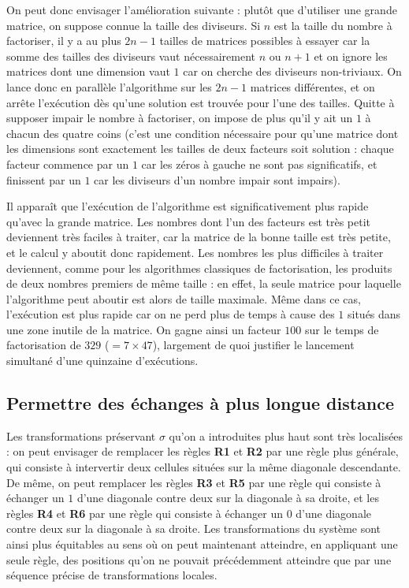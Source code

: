 \documentclass[11pt, openany]{article}
\begin{document}
On peut donc envisager l'amélioration suivante : plutôt que d'utiliser une grande matrice, on suppose connue la taille des diviseurs. Si $n$ est la taille du nombre à factoriser, il y a au plus $2n-1$ tailles de matrices possibles à essayer car la somme des tailles des diviseurs vaut nécessairement $n$ ou $n+1$ et on ignore les matrices dont une dimension vaut $1$ car on cherche des diviseurs non-triviaux. On lance donc en parallèle l'algorithme sur les $2n-1$ matrices différentes, et on arrête l'exécution dès qu'une solution est trouvée pour l'une des tailles. Quitte à supposer impair le nombre à factoriser, on impose de plus qu'il y ait un $1$ à chacun des quatre coins (c'est une condition nécessaire pour qu'une matrice dont les dimensions sont exactement les tailles de deux facteurs soit solution : chaque facteur commence par un $1$ car les zéros à gauche ne sont pas significatifs, et finissent par un $1$ car les diviseurs d'un nombre impair sont impairs). 

\medskip
Il apparaît que l'exécution de l'algorithme est significativement plus rapide qu'avec la grande matrice. Les nombres dont l'un des facteurs est très petit deviennent très faciles à traiter, car la matrice de la bonne taille est très petite, et le calcul y aboutit donc rapidement. Les nombres les plus difficiles à traiter deviennent, comme pour les algorithmes classiques de factorisation, les produits de deux nombres premiers de même taille : en effet, la seule matrice pour laquelle l'algorithme peut aboutir est alors de taille maximale. Même dans ce cas, l'exécution est plus rapide car on ne perd plus de temps à cause des $1$ situés dans une zone inutile de la matrice. On gagne ainsi un facteur $100$ sur le temps de factorisation de $329$ ($ =7\times 47$), largement de quoi justifier le lancement simultané d'une quinzaine d'exécutions. %


\subsection*{Permettre des échanges à plus longue distance}

Les transformations préservant $\sigma$ qu'on a introduites plus haut sont très localisées : on peut envisager de remplacer les règles \textbf{R1} et \textbf{R2} par une règle plus générale, qui consiste à intervertir deux cellules situées sur la même diagonale descendante. De même, on peut remplacer les règles \textbf{R3} et \textbf{R5} par une règle qui consiste à échanger un $1$ d'une diagonale contre deux sur la diagonale à sa droite, et les règles \textbf{R4} et \textbf{R6} par une règle qui consiste à échanger un $0$ d'une diagonale contre deux sur la diagonale à sa droite. Les transformations du système sont ainsi plus équitables au sens où on peut maintenant atteindre, en appliquant une seule règle, des positions qu'on ne pouvait précédemment atteindre que par une séquence précise de transformations locales. 
\end{document}
